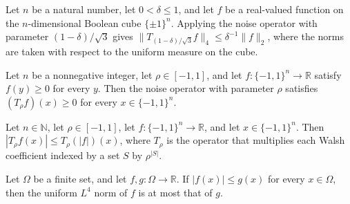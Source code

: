 \begin{theorem}
\label{FABL.exercise9_6_scaledNoise_norm_le_inv}
\leanok
{}
Let $n$ be a natural number, let $0<\delta\leq 1$, and let $f$ be a real-valued function
on the $n$-dimensional Boolean cube $\{\pm1\}^n$. Applying the noise operator with
parameter $(1-\delta)/\sqrt{3}$ gives $\|T_{(1-\delta)/\sqrt{3}}f\|_4\leq
\delta^{-1}\|f\|_2$, where the norms are taken with respect to the uniform measure on
the cube.
\end{theorem}

\begin{theorem}
\label{FABL.noiseOperator_nonneg}
\leanok
{}
Let $n$ be a nonnegative integer, let $\rho\in[-1,1]$, and let
$f\colon\{−1,1\}^n\to\mathbb R$ satisfy $f(y)\ge0$ for every $y$. Then the noise
operator with parameter $\rho$ satisfies $(T_\rho f)(x)\ge0$ for every $x\in\{−1,1\}^n$.
\end{theorem}

\begin{theorem}
\label{FABL.abs_noiseOperator_le_noiseOperator_abs}
\leanok
{}
Let $n\in\mathbb N$, let $\rho\in[-1,1]$, let $f\colon\{-1,1\}^n\to\mathbb R$, and let
$x\in\{-1,1\}^n$. Then $|T_\rho f(x)|\leq T_\rho(|f|)(x)$, where $T_\rho$ is the
operator that multiplies each Walsh coefficient indexed by a set $S$ by $\rho^{|S|}$.
\end{theorem}

\begin{theorem}
\label{FABL.uniformLpNorm_four_mono_abs}
\leanok
{}
Let $\Omega$ be a finite set, and let $f,g:\Omega\to\mathbb R$. If $|f(x)|\le g(x)$
for every $x\in\Omega$, then the uniform $L^4$ norm of $f$ is at most that of $g$.
\end{theorem}


